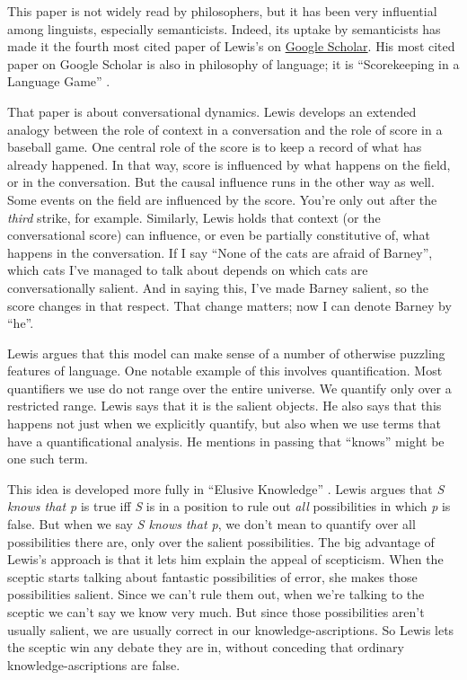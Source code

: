 This paper is not widely read by philosophers, but it has been very influential among linguists, especially semanticists. Indeed, its uptake by semanticists has made it the fourth most cited paper of Lewis's on \href{http://scholar.google.com" target="other}{Google Scholar}. His most cited paper on Google Scholar is also in philosophy of language; it is ``Scorekeeping in a Language Game'' \citeyearpar{Lewis1979f}.

That paper is about conversational dynamics. Lewis develops an extended analogy between the role of context in a conversation and the role of score in a baseball game. One central role of the score is to keep a record of what has already happened. In that way, score is influenced by what happens on the field, or in the conversation. But the causal influence runs in the other way as well. Some events on the field are influenced by the score. You're only out after the \textit{third} strike, for example. Similarly, Lewis holds that context (or the conversational score) can influence, or even be partially constitutive of, what happens in the conversation. If I say ``None of the cats are afraid of Barney'', which cats I've managed to talk about depends on which cats are conversationally salient. And in saying this, I've made Barney salient, so the score changes in that respect. That change matters; now I can denote Barney by ``he''.

Lewis argues that this model can make sense of a number of otherwise puzzling features of language. One notable example of this involves quantification. Most quantifiers we use do not range over the entire universe. We quantify only over a restricted range. Lewis says that it is the salient objects. He also says that this happens not just when we explicitly quantify, but also when we use terms that have a quantificational analysis. He mentions in passing that ``knows'' might be one such term.

This idea is developed more fully in ``Elusive Knowledge'' \citeyearpar{Lewis1996b}. Lewis argues that \textit{S knows that p} is true iff \textit{S} is in a position to rule out \textit{all} possibilities in which \textit{p} is false. But when we say \textit{S knows that p}, we don't mean to quantify over all possibilities there are, only over the salient possibilities. The big advantage of Lewis's approach is that it lets him explain the appeal of scepticism. When the sceptic starts talking about fantastic possibilities of error, she makes those possibilities salient. Since we can't rule them out, when we're talking to the sceptic we can't say we know very much. But since those possibilities aren't usually salient, we are usually correct in our knowledge-ascriptions. So Lewis lets the sceptic win any debate they are in, without conceding that ordinary knowledge-ascriptions are false.

